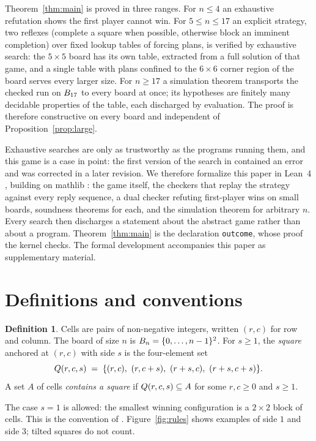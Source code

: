 \documentclass[11pt]{amsart}
\theoremstyle{definition}
\newtheorem{definition}[theorem]{Definition}
\theoremstyle{remark}
\begin{document}
Theorem~\ref{thm:main} is proved in three ranges. For $n \le 4$
an exhaustive refutation shows the first player cannot win. For
$5 \le n \le 17$ an explicit strategy, two reflexes (complete a
square when possible, otherwise block an imminent completion) over
fixed lookup tables of forcing plans, is verified by exhaustive
search: the $5 \times 5$ board has its own table, extracted from a
full solution of that game, and a single table with plans confined
to the $6 \times 6$ corner region of the board serves every larger
size. For $n \ge 17$ a simulation theorem transports the checked run
on $B_{17}$ to every board at once; its hypotheses are finitely
many decidable properties of the table, each discharged by
evaluation. The proof is therefore constructive on every board and
independent of Proposition~\ref{prop:large}.

Exhaustive searches are only as trustworthy as the programs running
them, and this game is a case in point: the first version of the
search in \cite{jenrich} contained an error and was corrected in a
later revision. We therefore formalize this paper in Lean~4 \cite{lean4},
building on mathlib \cite{mathlib}: the game itself, the checkers
that replay the strategy against every reply sequence, a dual
checker refuting first-player wins on small boards, soundness
theorems for each, and the simulation theorem for arbitrary $n$.
Every search then discharges a statement about the abstract game
rather than about a program. Theorem~\ref{thm:main} is the
declaration \texttt{outcome}, whose proof the kernel checks. The
formal development accompanies this paper as supplementary material.

\section{Definitions and conventions}\label{sec:defs}

\begin{definition}
Cells are pairs of non-negative integers, written $(r, c)$ for row and
column. The board of size $n$ is $B_n = \{0, \dots, n-1\}^2$. For
$s \ge 1$, the \emph{square} anchored at $(r, c)$ with side $s$ is the
four-element set
\[
  Q(r,c,s) \;=\; \{(r,c),\ (r,c+s),\ (r+s,c),\ (r+s,c+s)\}.
\]
A set $A$ of cells \emph{contains a square} if
$Q(r,c,s) \subseteq A$ for some $r, c \ge 0$ and $s \ge 1$.
\end{definition}

The case $s = 1$ is allowed: the smallest winning configuration is a
$2 \times 2$ block of cells. This is the convention of
\cite{jenrich, bacher-eliahou}. Figure~\ref{fig:rules} shows examples
of side $1$ and side $3$; tilted squares do not count.
\end{document}
